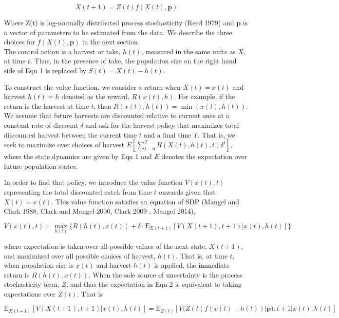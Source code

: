 \documentclass[author-year, 12pt,review]{components/elsarticle} %
\begin{document}
\begin{equation}
X(t+1) = Z(t) f(X(t), \mathbf{p}) \label{eq1} 
\end{equation}

Where Z(t) is log-normally distributed process stochasticity (Reed 1979)
and \(\mathbf{p}\) is a vector of parameters to be estimated from the
data. We describe the three choices for \(f(X(t),\mathbf{p})\) in the
next section.\\The control action is a harvest or take, \(h(t)\),
measured in the same units as \(X\), at time \(t\). Thus, in the
presence of take, the population size on the right hand side of Eqn 1 is
replaced by \(S(t) = X(t) - h(t)\).

To construct the value function, we consider a return when
\(X(t) = x(t)\) and harvest \(h(t) = h\) denoted as the reward,
\(R(x(t), h)\). For example, if the return is the harvest at time \(t\),
then \(R(x(t), h(t)) = \min(x(t), h(t))\). We assume that future
harvests are discounted relative to current ones at a constant rate of
discount \(\delta\) and ask for the harvest policy that maximizes total
discounted harvest between the current time \(t\) and a final time
\(T\). That is, we seek to maximize over choices of harvest
\(E [ \sum_{t = 0}^{T} R(X(t), h(t), t) \delta^t]\), where the state
dynamics are given by Eqn 1 and \(E\) denotes the expectation over
future population states.

In order to find that policy, we introduce the value function
\(V(x(t), t)\) representing the total discounted catch from time \(t\)
onwards given that \(X(t) = x(t)\). This value function satisfies an
equation of SDP (Mangel and Clark 1988, Clark and Mangel 2000, Clark
2009 , Mangel 2014),

\begin{equation}
V(x(t), t) = \max_{h(t)} \lbrace R(h(t), x(t)) + \delta \cdot \mathbf{\mathrm{E}}_{X(t+1)} \left[ V(X(t+1), t+1) | x(t), h(t) \right] \rbrace
\end{equation}

where expectation is taken over all possible values of the next state,
\(X(t+1)\), and maximized over all possible choices of harvest,
\(h(t)\). That is, at time \(t\), when population size is \(x(t)\) and
harvest \(h(t)\) is applied, the immediate return is \(R(h(t), x(t))\).
When the sole source of uncertainty is the process stochasticity term,
\(Z\), and thus the expectation in Eqn 2 is equivalent to taking
expectations over \(Z(t)\). That is

\begin{equation}
\mathbf{\mathrm{E}}_{X(t+1)} \left[ V( X(t+1),t+1) | x(t), h(t) \right] = \mathbf{\mathrm{E}}_{Z(t)} \left[V( Z(t) f(x(t) - h(t))|\mathbf{p}), t+1 | x(t), h(t) \right]
\end{equation}
\end{document}

